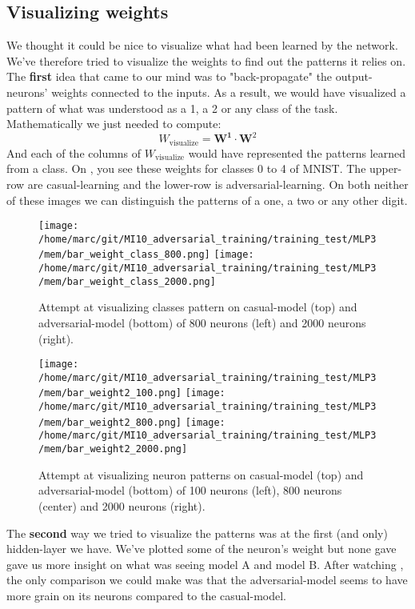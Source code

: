 		\subsection{Visualizing weights}
		\label{ssub:visualizing_weights}
			We thought it could be nice to visualize what had been learned by the network. We've therefore tried to visualize the weights to find out the patterns it relies on. The \textbf{first} idea that came to our mind was to "back-propagate" the output-neurons' weights connected to the inputs. As a result, we would have visualized a pattern of what was understood as a 1, a 2 or any class of the task. Mathematically we just needed to compute:
			$$ W_{\text{visualize}} = \boldsymbol{W^1} \cdot \boldsymbol{W}^2 $$
			And each of the columns of $W_{\text{visualize}}$ would have represented the patterns learned from a class. On , you see these weights for classes 0 to 4 of MNIST. The upper-row are casual-learning and the lower-row is adversarial-learning. On both neither of these images we can distinguish the patterns of a one, a two or any other digit.
			\begin{figure}
				\centering
				\texttt{[image: /home/marc/git/MI10\_adversarial\_training/training\_test/MLP3/mem/bar\_weight\_class\_800.png]}
				\texttt{[image: /home/marc/git/MI10\_adversarial\_training/training\_test/MLP3/mem/bar\_weight\_class\_2000.png]}
				\caption{Attempt at visualizing classes pattern on casual-model (top) and adversarial-model (bottom) of 800 neurons (left) and 2000 neurons (right).}
				\label{fig:mnist_weight_class}
			\end{figure}
			\begin{figure}
				\centering
				\texttt{[image: /home/marc/git/MI10\_adversarial\_training/training\_test/MLP3/mem/bar\_weight2\_100.png]}
				\texttt{[image: /home/marc/git/MI10\_adversarial\_training/training\_test/MLP3/mem/bar\_weight2\_800.png]}
				\texttt{[image: /home/marc/git/MI10\_adversarial\_training/training\_test/MLP3/mem/bar\_weight2\_2000.png]}
				\caption{Attempt at visualizing neuron patterns on casual-model (top) and adversarial-model (bottom) of 100 neurons (left), 800 neurons (center) and 2000 neurons (right).}
				\label{fig:mnist_weight}
			\end{figure}

			The \textbf{second} way we tried to visualize the patterns was at the first (and only) hidden-layer we have. We've plotted some of the neuron's weight but none gave gave us more insight on what was seeing model A and model B. After watching , the only comparison we could make was that the adversarial-model seems to have more grain on its neurons compared to the casual-model.

